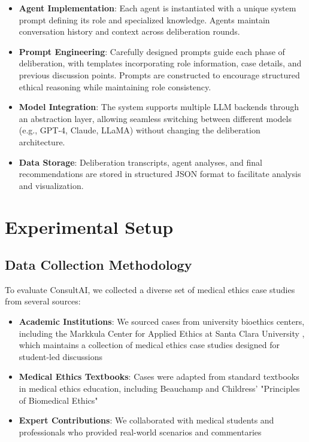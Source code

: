 \documentclass[11pt]{article}
\begin{document}
\begin{itemize}
    \item \textbf{Agent Implementation}: Each agent is instantiated with a unique system prompt defining its role and specialized knowledge. Agents maintain conversation history and context across deliberation rounds.
    
    \item \textbf{Prompt Engineering}: Carefully designed prompts guide each phase of deliberation, with templates incorporating role information, case details, and previous discussion points. Prompts are constructed to encourage structured ethical reasoning while maintaining role consistency.
    
    \item \textbf{Model Integration}: The system supports multiple LLM backends through an abstraction layer, allowing seamless switching between different models (e.g., GPT-4, Claude, LLaMA) without changing the deliberation architecture.
    
    \item \textbf{Data Storage}: Deliberation transcripts, agent analyses, and final recommendations are stored in structured JSON format to facilitate analysis and visualization.
\end{itemize}

\section{Experimental Setup}

\subsection{Data Collection Methodology}

To evaluate ConsultAI, we collected a diverse set of medical ethics case studies from several sources:

\begin{itemize}
    \item \textbf{Academic Institutions}: We sourced cases from university bioethics centers, including the Markkula Center for Applied Ethics at Santa Clara University \cite{scu_ethics}, which maintains a collection of medical ethics case studies designed for student-led discussions
    \item \textbf{Medical Ethics Textbooks}: Cases were adapted from standard textbooks in medical ethics education, including Beauchamp and Childress' "Principles of Biomedical Ethics" \cite{beauchamp2001principles}
    \item \textbf{Expert Contributions}: We collaborated with medical students and professionals who provided real-world scenarios and commentaries
\end{itemize}
\end{document}
